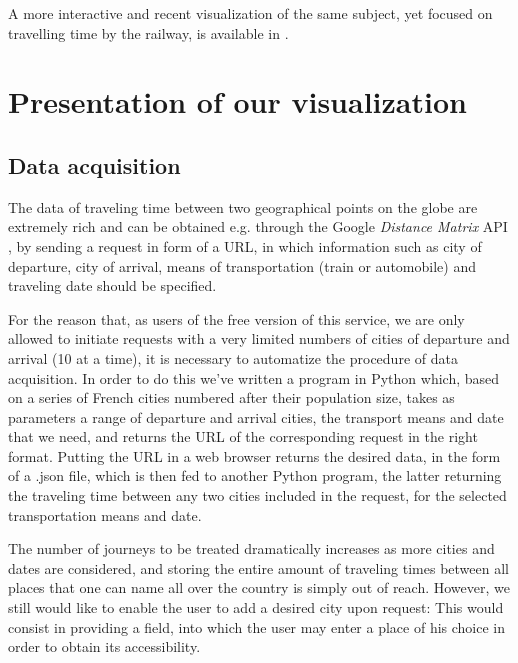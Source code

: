\documentclass{vgtc}                          %
\begin{document}
A more interactive and recent visualization of the same subject, yet focused on travelling time by the railway, is available in \cite{LeMonde1}.


\section{Presentation of our visualization}

\vspace{0.1cm}

\subsection{Data acquisition}

\vspace{0.2cm}

The data of traveling time between two geographical points on the globe are extremely rich and can be obtained e.g. through the Google \textit{Distance Matrix} API \cite{APIGoogle},
by sending a request in form of a URL, in which information such as city of departure, city of arrival, means of transportation (train or automobile) and traveling date should be specified.  
  

For the reason that, as users of the free version of this service, we are only allowed to initiate requests with a very limited numbers of cities of departure and arrival (10 at a time), it is necessary to automatize the procedure of data acquisition. In order to do this we've written a program in Python which, based on a series of French cities numbered after their population size, takes as parameters a range of departure and arrival cities, the transport means and date that we need, and returns the URL of the corresponding request in the right format. Putting the URL in a web browser returns the desired data, in the form of a .json file, which is then fed to another Python program, the latter returning the traveling time between any two cities included in the request, for the selected transportation means and date.  


The number of journeys to be treated dramatically increases as more cities and dates are considered, and storing the entire amount of traveling times between all places that one can name all over the country is simply out of reach. However, we still would like to enable the user to add a desired city upon request: This would consist in providing a field, into which the user may enter a place of his choice in order to obtain its accessibility.
\end{document}
